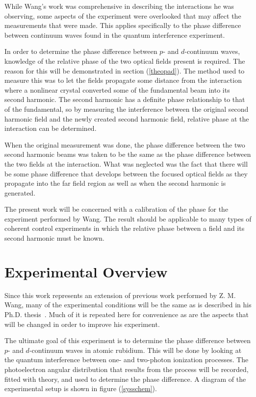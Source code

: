 While Wang's work was comprehensive in describing the interactions
he was observing, some aspects of the experiment were overlooked
that may affect the measurements that were made.  This applies
specifically to the phase difference between continuum waves found
in the quantum interference experiment.

In order to determine the phase difference between $p$- and
$d$-continuum waves, knowledge of the relative phase of the two
optical fields present is required.  The reason for this will be
demonstrated in section (\ref{theopad}).  The method used to
measure this was to let the fields propagate some distance from
the interaction where a nonlinear crystal converted some of the
fundamental beam into its second harmonic. The second harmonic has
a definite phase relationship to that of the fundamental, so by
measuring the interference between the original second harmonic
field and the newly created second harmonic field, relative phase
at the interaction can be determined.

When the original measurement was done, the phase difference
between the two second harmonic beams was taken to be the same as
the phase difference between the two fields at the interaction.
What was neglected was the fact that there will be some phase
difference that develops between the focused optical fields as
they propagate into the far field region as well as when the
second harmonic is generated.

The present work will be concerned with a calibration of the phase
for the experiment performed by Wang.  The result should be
applicable to many types of coherent control experiments in which
the relative phase between a field and its second harmonic must be
known.


\section{Experimental Overview}
\label{expover}

Since this work represents an extension of previous work performed
by Z. M. Wang, many of the experimental conditions will be the
same as is described in his Ph.D. thesis~\cite{Wang0}.  Much of it
is repeated here for convenience as are the aspects that will be
changed in order to improve his experiment.

The ultimate goal of this experiment is to determine the phase
difference between $p$- and $d$-continuum waves in atomic
rubidium.  This will be done by looking at the quantum
interference between one- and two-photon ionization processes. The
photoelectron angular distribution that results from the process
will be recorded, fitted with theory, and used to determine the
phase difference. A diagram of the experimental setup is shown in
figure (\ref{sysschem}).


